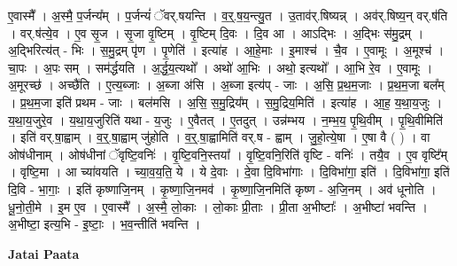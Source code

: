 \documentclass[17pt]{extarticle}
\begin{document}
ए॒वास्मै᳚ । अ॒स्मै॒ प॒र्जन्य᳚म् । प॒र्जन्यं॑ ॅवर्.षयन्ति । व॒र्॒.ष॒य॒न्त्यु॒त । उ॒ताव॑र्.षिष्यन्न् । अव॑र्.षिष्य॒न् वर्.ष॑ति । वर्.ष॑त्ये॒व । ए॒व सृ॒ज । सृ॒जा वृ॒ष्टिम् । वृ॒ष्टिम् दि॒वः । दि॒व आ । आऽद्भिः । अ॒द्भिः स॑मु॒द्रम् । अ॒द्भिरित्य॑त् - भिः । स॒मु॒द्रम् पृ॑ण । पृ॒णेति॑ । इत्या॑ह । आ॒हे॒माः । इ॒माश्च॑ । चै॒व । ए॒वामूः । अ॒मूश्च॑ । चा॒पः । अ॒पः सम् । सम॑र्द्धयति । अ॒र्द्ध॒य॒त्यथो᳚ । अथो॑ आ॒भिः । अथो॒ इत्यथो᳚ । आ॒भि रे॒व । ए॒वामूः । अ॒मूरच्छ॑ । अच्छै॑ति । ए॒त्य॒ब्जाः । अ॒ब्जा अ॑सि । अ॒ब्जा इत्य॑प् - जाः । अ॒सि॒ प्र॒थ॒म॒जाः । प्र॒थ॒म॒जा बल᳚म् । प्र॒थ॒म॒जा इति॑ प्रथम - जाः । बल॑मसि । अ॒सि॒ स॒मु॒द्रिय᳚म् । स॒मु॒द्रिय॒मिति॑ । इत्या॑ह । आ॒ह॒ य॒था॒य॒जुः । य॒था॒य॒जुरे॒व । य॒था॒य॒जुरिति॑ यथा - य॒जुः । ए॒वैतत् । ए॒तदुत् । उन्न॑म्भय । न॒म्भ॒य॒ पृ॒थि॒वीम् । पृ॒थि॒वीमिति॑ । इति॑ वर्.षा॒ह्वाम् । व॒र्॒.षा॒ह्वाम् जु॑होति । व॒र्॒.षा॒ह्वामिति॑ वर्.ष - ह्वाम् । जु॒हो॒त्ये॒षा । ए॒षा वै ( ) । वा ओष॑धीनाम् । ओष॑धीनां ॅवृष्टि॒वनिः॑ । वृ॒ष्टि॒वनि॒स्तया᳚ । वृ॒ष्टि॒वनि॒रिति॑ वृष्टि - वनिः॑ । तयै॒व । ए॒व वृष्टि᳚म् । वृष्टि॒मा । आ च्या॑वयति । च्या॒व॒य॒ति॒ ये । ये दे॒वाः । दे॒वा दि॒विभा॑गाः । दि॒विभा॑गा॒ इति॑ । दि॒विभा॑गा॒ इति॑ दि॒वि - भा॒गाः॒ । इति॑ कृष्णाजि॒नम् । कृ॒ष्णा॒जि॒नमव॑ । कृ॒ष्णा॒जि॒नमिति॑ कृष्ण - अ॒जि॒नम् । अव॑ धूनोति । धू॒नो॒ती॒मे । इ॒म ए॒व । ए॒वास्मै᳚ । अ॒स्मै॒ लो॒काः । लो॒काः प्री॒ताः । प्री॒ता अ॒भीष्टाः᳚ । अ॒भीष्टा॑ भवन्ति । अ॒भीष्टा॒ इत्य॒भि - इ॒ष्टाः॒ । भ॒व॒न्तीति॑ भवन्ति । \newline

\textbf{Jatai Paata} \newline
\end{document}
